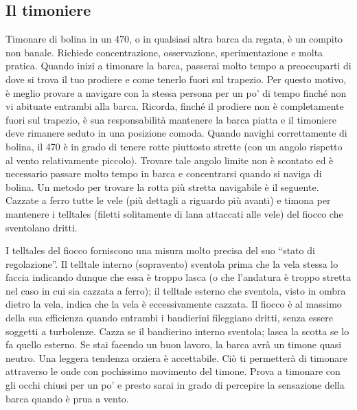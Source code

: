 \subsection{Il timoniere}
\label{subsec:IlTimoniere}
Timonare di bolina in un 470, o in qualsiasi altra barca da regata, è un compito
non banale. Richiede concentrazione, osservazione, sperimentazione e molta
pratica. Quando inizi a timonare la barca, passerai molto tempo a preoccuparti
di dove si trova il tuo prodiere e come tenerlo fuori sul trapezio. Per questo
motivo, è meglio provare a navigare con la stessa persona per un po' di tempo
finché non vi abituate entrambi alla barca. Ricorda, finché il prodiere non è
completamente fuori sul trapezio, è sua responsabilità mantenere la barca piatta
e il timoniere deve rimanere seduto in una posizione comoda. Quando navighi
correttamente di bolina, il 470 è in grado di tenere rotte piuttosto strette
(con un angolo rispetto al vento relativamente piccolo). Trovare tale angolo
limite non è scontato ed è necessario passare molto tempo in barca e
concentrarsi quando si naviga di bolina. Un metodo per trovare la rotta più
stretta navigabile è il seguente. Cazzate a ferro tutte le vele (più dettagli a
riguardo più avanti) e timona per mantenere i telltales (filetti solitamente di
lana attaccati alle vele) del fiocco che sventolano dritti.

I telltales del fiocco forniscono una misura molto precisa del suo ``stato di
regolazione''. Il telltale interno (sopravento) sventola prima che la vela
stessa lo faccia indicando dunque che essa è troppo lasca (o che l'andatura è
troppo stretta nel caso in cui sia cazzata a ferro); il telltale esterno che
sventola, visto in ombra dietro la vela, indica che la vela è eccessivamente
cazzata. Il fiocco è al massimo della sua efficienza quando entrambi i
bandierini fileggiano dritti, senza essere soggetti a turbolenze. Cazza se il
bandierino interno sventola; lasca la scotta se lo fa quello esterno. Se stai
facendo un buon lavoro, la barca avrà un timone quasi neutro. Una leggera
tendenza orziera è accettabile. Ciò ti permetterà di timonare attraverso le onde
con pochissimo movimento del timone. Prova a timonare con gli occhi chiusi per
un po' e presto sarai in grado di percepire la sensazione della barca quando è
prua a vento.

